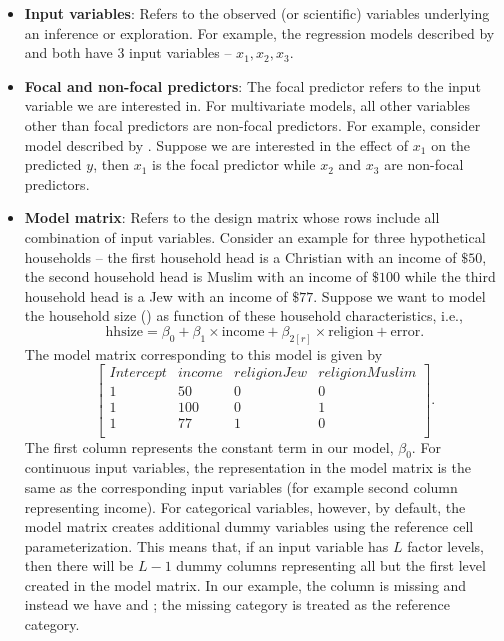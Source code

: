 \begin{itemize}
\item \textbf{Input variables}: Refers to the observed (or scientific) variables underlying an inference or exploration. For example, the regression models described by  and  both have $3$ input variables -- $x_1, x_2, x_3$.
\item \textbf{Focal and non-focal predictors}: The focal predictor refers to the input variable we are interested in. For multivariate models, all other variables other than focal predictors are non-focal predictors. For example, consider model described by . Suppose we are interested in the effect of $x_1$ on the predicted $y$, then $x_1$ is the focal predictor while $x_2$ and $x_3$ are non-focal predictors.
\item \textbf{Model matrix}: Refers to the design matrix whose rows include all combination of input variables. Consider an example for three hypothetical households -- the first household head is a Christian with an income of $\$ 50$, the second household head is Muslim with an income of $\$ 100$ while the third household head is a Jew with an income of $\$ 77$. Suppose we want to model the household size () as function of these household characteristics, i.e., $$\mathrm{hhsize} = \beta_0 + \beta_1\times\mathrm{income} + \beta_{2[r]}\times\mathrm{religion} + \mathrm{error}.$$ The model matrix corresponding to this model is given by
$$\begin{bmatrix}{}
 Intercept & income & religionJew & religionMuslim \\
 1 & 50 & 0 & 0 \\
  1 & 100 & 0 & 1 \\
  1 & 77 & 1 & 0 \\
\end{bmatrix}.$$ The first column represents the constant term in our model, $\beta_0$. For continuous input variables, the representation in the model matrix is the same as the corresponding input variables (for example second column representing income). For categorical variables, however, by default, the model matrix  creates additional dummy variables using the reference cell parameterization. This means that, if an input variable has $L$ factor levels, then there will be $L-1$ dummy columns representing all but the first level created in the model matrix. In our example, the column  is missing and instead we have  and ; the missing category  is treated as the reference category.

\end{itemize}
